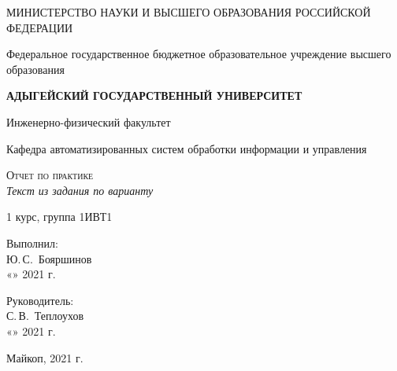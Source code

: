 \documentclass[12pt,a4paper]{scrartcl}
\begin{document}
	\begin{titlepage}
		\begin{center}
			\large
			МИНИСТЕРСТВО НАУКИ И ВЫСШЕГО ОБРАЗОВАНИЯ РОССИЙСКОЙ ФЕДЕРАЦИИ
			
			Федеральное государственное бюджетное образовательное учреждение высшего образования
			
			\textbf{АДЫГЕЙСКИЙ ГОСУДАРСТВЕННЫЙ УНИВЕРСИТЕТ}
			\vspace{0.25cm}
			
			Инженерно-физический факультет
			
			Кафедра автоматизированных систем обработки информации и управления
			\vfill

			\vfill
			
			\textsc{Отчет по практике}\\[5mm]
			
			{\LARGE \textit{Текст из задания по варианту}}
			\bigskip
			
			1 курс, группа 1ИВТ1
		\end{center}
		\vfill
		
		\newlength{\ML}
		\hfill\begin{minipage}{0.5\textwidth}
			Выполнил:\\
			\underline{\hspace{\ML}} Ю.\,С.~Бояршинов\\
			«\underline{\hspace{0.7cm}}» \underline{\hspace{2cm}} 2021 г.
		\end{minipage}%
		\bigskip
		
		\hfill\begin{minipage}{0.5\textwidth}
			Руководитель:\\
			\underline{\hspace{\ML}} С.\,В.~Теплоухов\\
			«\underline{\hspace{0.7cm}}» \underline{\hspace{2cm}} 2021 г.
		\end{minipage}%
		\vfill
	
		\begin{center}
			Майкоп, 2021 г.
		\end{center}
	\end{titlepage}
\end{document}
